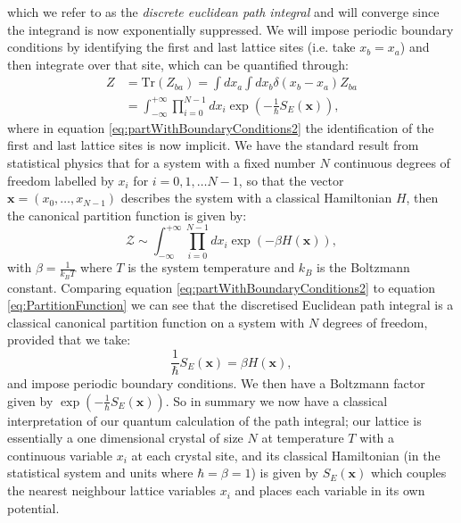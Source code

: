 \documentclass[12pt]{article}
\begin{document}
        which we refer to as the \textit{discrete euclidean path integral} and will converge since the integrand is now exponentially suppressed. We will impose periodic boundary conditions by identifying the first and last lattice sites (i.e. take $x_b=x_a$) and then integrate over that site, which can be quantified through: 
        \begin{align}
            \label{eq:partWithBoundaryConditions1}
            Z & = \text{Tr}\left(Z_{ba}\right) = \int dx_a \int dx_b \delta\left(x_b-x_a\right)Z_{ba} \\
            \label{eq:partWithBoundaryConditions2}
              & = \int^{+\infty}_{-\infty}\prod_{i=0}^{N-1}dx_i \exp{\left(-\frac{1}{\hbar}S_{E}\left(\bm{x}\right)\right)},
        \end{align}
        where in equation \ref{eq:partWithBoundaryConditions2} the identification of the first and last lattice sites is now implicit. We have the standard result from statistical physics that for a system with a fixed number $N$ continuous degrees of freedom labelled by $x_i$ for $i=0,1,\dots N-1$, so that the vector $\bm{x}=\left(x_0,\dots,x_{N-1}\right)$ describes the system with a classical Hamiltonian $H$, then the canonical partition function is given by:
        \begin{equation}
            \label{eq:PartitionFunction}
            \mathcal{Z} \sim \int_{-\infty}^{+\infty}\prod_{i=0}^{N-1}dx_{i}\exp{\left(-\beta H\left(\bm{x}\right)\right)},
        \end{equation}
        with $\beta=\frac{1}{k_{B}T}$ where $T$ is the system temperature and $k_{B}$ is the Boltzmann constant. Comparing equation \ref{eq:partWithBoundaryConditions2} to equation \ref{eq:PartitionFunction} we can see that the discretised Euclidean path integral is a classical canonical partition function on a system with $N$ degrees of freedom, provided that we take:
        \begin{equation}
            \label{ActionToHamiltonian}
            \frac{1}{\hbar}S_{E}\left(\bm{x}\right) = \beta H\left(\bm{x}\right),
        \end{equation}
        and impose periodic boundary conditions. We then have a Boltzmann factor given by $\exp{\left(-\frac{1}{\hbar}S_{E}\left(\bm{x}\right)\right)}$. So in summary we now have a classical interpretation of our quantum calculation of the path integral; our lattice is essentially a one dimensional crystal of size $N$ at temperature $T$ with a continuous variable $x_i$ at each crystal site, and its classical Hamiltonian (in the statistical system and units where $\hbar=\beta=1$) is given by $S_E\left(\bm{x}\right)$ which couples the nearest neighbour lattice variables $x_i$ and places each variable in its own potential. 
\end{document}
